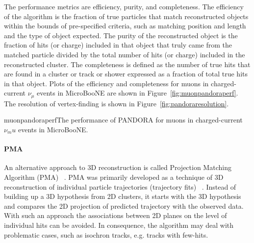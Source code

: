 The performance metrics are efficiency, purity, and completeness.  The
efficiency of the algorithm is the fraction of true particles that
match reconstructed objects within the bounds of pre-specified
criteria, such as matching position and length and the type of object
expected.  The purity of the reconstructed object is the fraction of
hits (or charge) included in that object that truly came from the
matched particle divided by the total number of hits (or charge)
included in the reconstructed cluster.  The completeness is defined as
the number of true hits that are found in a cluster or track or shower
expressed as a fraction of total true hits in that object.  Plots of
the efficiency and completeness for muons in charged-current $\nu_{\mu}$
events in MicroBooNE are shown in Figure~\ref{fig:muonpandoraperf}.
The resolution of vertex-finding is shown in
Figure~\ref{fig:pandoraresolution}.

\begin{cdrfigure}{muonpandoraperf}{The performance of PANDORA for muons in charged-current
  $\nu_mu$ events in MicroBooNE. }
\end{cdrfigure}


\paragraph{PMA}
An alternative approach to 3D reconstruction is called Projection Matching Algorithm
(PMA) ~\cite{pma_algorithm}. PMA was primarily developed as a technique of 3D reconstruction
of individual particle trajectories (trajectory fits) ~\cite{icarus3dreco}. Instead of
building up a 3D hypothesis from 2D clusters, it starts with the 3D hypothesis and compares
the 2D projection of predicted trajectory with the observed data. With such an approach
the associations between 2D planes on the level of individual hits can be avoided.
In consequence, the algorithm may deal with problematic cases, such as isochron tracks,
e.g. tracks with few-hits.

